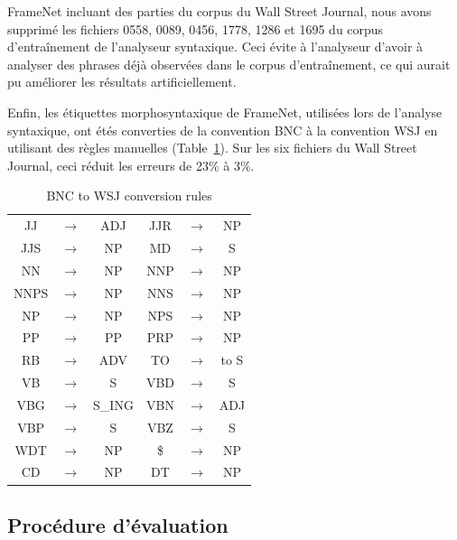 FrameNet incluant des parties du corpus du Wall Street Journal, nous avons
supprimé les fichiers 0558, 0089, 0456, 1778, 1286 et 1695 du corpus
d'entraînement de l'analyseur syntaxique. Ceci évite à l'analyseur d'avoir à
analyser des phrases déjà observées dans le corpus d'entraînement, ce qui
aurait pu améliorer les résultats artificiellement.

Enfin, les étiquettes morphosyntaxique de FrameNet, utilisées lors de l'analyse
syntaxique, ont étés converties de la convention BNC à la convention WSJ en
utilisant des règles manuelles (Table~\ref{table:tagset_rules}). Sur les six
fichiers du Wall Street Journal, ceci réduit les erreurs de 23\% à 3\%.

\begin{table}[ht]
    \centering
    \begin{tabular}{ccc|ccc}
        \toprule
        JJ   &$\to$& ADJ    & JJR  &$\to$& NP     \\
        JJS  &$\to$& NP     & MD   &$\to$& S      \\
        NN   &$\to$& NP     & NNP  &$\to$& NP     \\
        NNPS &$\to$& NP     & NNS  &$\to$& NP     \\
        NP   &$\to$& NP     & NPS  &$\to$& NP     \\
        PP   &$\to$& PP     & PRP  &$\to$& NP     \\  
        RB   &$\to$& ADV    & TO   &$\to$& to S   \\
        VB   &$\to$& S      & VBD  &$\to$& S      \\
        VBG  &$\to$& S\_ING & VBN  &$\to$& ADJ    \\
        VBP  &$\to$& S      & VBZ  &$\to$& S      \\
        WDT  &$\to$& NP     & \$   &$\to$& NP     \\  
        CD   &$\to$& NP     & DT   &$\to$& NP     \\
        \bottomrule
    \end{tabular}
    \caption{\protect\centering\label{table:tagset_rules}BNC to WSJ conversion rules}
\end{table}


\subsection{Procédure d'évaluation}

